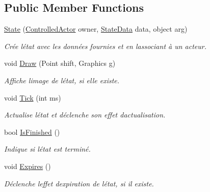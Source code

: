 \subsection*{Public Member Functions}
\begin{DoxyCompactItemize}
\item 
\hyperlink{class_tentacle_slicers_1_1states_1_1_state_a405645215bbd1ac34d5b0a209366da29}{State} (\hyperlink{class_tentacle_slicers_1_1actors_1_1_controlled_actor}{Controlled\+Actor} owner, \hyperlink{class_tentacle_slicers_1_1states_1_1_state_data}{State\+Data} data, object arg)
\begin{DoxyCompactList}\small\item\em Crée l\textquotesingle{}état avec les données fournies et en l\textquotesingle{}associant à un acteur. \end{DoxyCompactList}\item 
void \hyperlink{class_tentacle_slicers_1_1states_1_1_state_ae9c5187fb53be4138e615a0c26b54f0a}{Draw} (Point shift, Graphics g)
\begin{DoxyCompactList}\small\item\em Affiche l\textquotesingle{}image de l\textquotesingle{}état, si elle existe. \end{DoxyCompactList}\item 
void \hyperlink{class_tentacle_slicers_1_1states_1_1_state_a0196a4dcb4894e5d0de3387bc9cfcf26}{Tick} (int ms)
\begin{DoxyCompactList}\small\item\em Actualise l\textquotesingle{}état et déclenche son effet d\textquotesingle{}actualisation. \end{DoxyCompactList}\item 
bool \hyperlink{class_tentacle_slicers_1_1states_1_1_state_a07bdea4c02bbee510c5323157459226f}{Is\+Finished} ()
\begin{DoxyCompactList}\small\item\em Indique si l\textquotesingle{}état est terminé. \end{DoxyCompactList}\item 
void \hyperlink{class_tentacle_slicers_1_1states_1_1_state_a7405f92e5a7163f6adfbc755eed537a1}{Expires} ()
\begin{DoxyCompactList}\small\item\em Déclenche l\textquotesingle{}effet d\textquotesingle{}expiration de l\textquotesingle{}état, si il existe. \end{DoxyCompactList}\end{DoxyCompactItemize}
